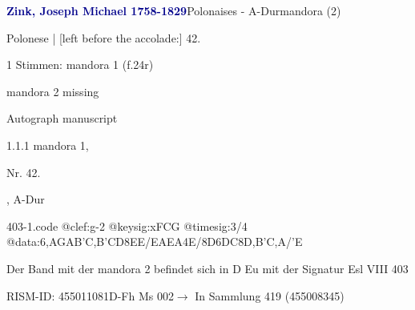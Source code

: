 \documentclass[twocolumn]{book}
\begin{document}
\par \vspace{7pt} \textcolor{darkblue}{\textbf{Zink, Joseph Michael  1758-1829}}\hfillplus{\textbf{[403]}}\newline Polonaises - A-Dur\newline mandora (2)
\par \begin{itshape}[f.24v, at left:] Polonese | [left before the accolade:] 42.\end{itshape} 
\par \textcolor{darkblue}{}  1 Stimmen: mandora 1  (f.24r)\newline \begin{small} mandora 2 missing\end{small} \newline Autograph manuscript
\par 1.1.1  mandora 1, \begin{itshape}Nr. 42.\end{itshape}, A-Dur  
\begin{filecontents*}{403-1.code}
@clef:g-2
@keysig:xFCG
@timesig:3/4
@data:{6,AGAB}{'C,B}{'CD}{8EE}/EAEA4E/{8D6DC}8D,B'C,A/'E
\end{filecontents*}
\newline
%
\par Der Band mit der mandora 2 befindet sich in D Eu mit der Signatur Esl VIII 403
\par RISM-ID: 455011081\newline D-Fh  Ms 002\newline $\rightarrow$ In Sammlung 419 (455008345)
      
\end{document}
